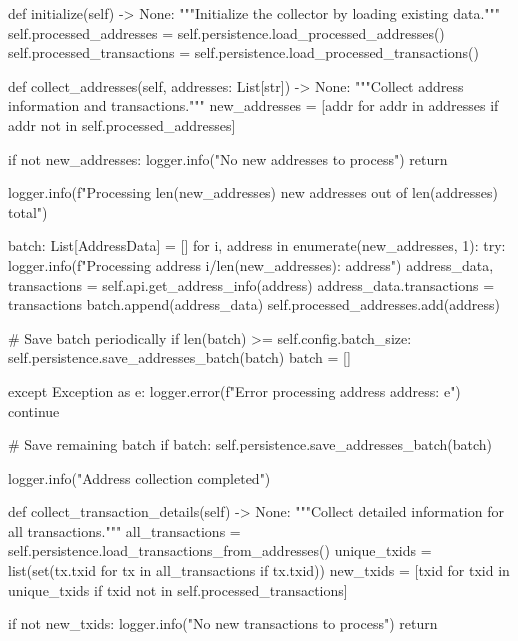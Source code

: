 \begin{codelisting}[language=Python, caption=Основной скрипт сбора данных]
    def initialize(self) -> None:
        """Initialize the collector by loading existing data."""
        self.processed_addresses = self.persistence.load_processed_addresses()
        self.processed_transactions = self.persistence.load_processed_transactions()
        
    def collect_addresses(self, addresses: List[str]) -> None:
        """Collect address information and transactions."""
        new_addresses = [addr for addr in addresses if addr not in self.processed_addresses]
        
        if not new_addresses:
            logger.info("No new addresses to process")
            return
            
        logger.info(f"Processing {len(new_addresses)} new addresses out of {len(addresses)} total")
        
        batch: List[AddressData] = []
        for i, address in enumerate(new_addresses, 1):
            try:
                logger.info(f"Processing address {i}/{len(new_addresses)}: {address}")
                address_data, transactions = self.api.get_address_info(address)
                address_data.transactions = transactions
                batch.append(address_data)
                self.processed_addresses.add(address)
                
                # Save batch periodically
                if len(batch) >= self.config.batch_size:
                    self.persistence.save_addresses_batch(batch)
                    batch = []
                    
            except Exception as e:
                logger.error(f"Error processing address {address}: {e}")
                continue
        
        # Save remaining batch
        if batch:
            self.persistence.save_addresses_batch(batch)
            
        logger.info("Address collection completed")
    
    def collect_transaction_details(self) -> None:
        """Collect detailed information for all transactions."""
        all_transactions = self.persistence.load_transactions_from_addresses()
        unique_txids = list(set(tx.txid for tx in all_transactions if tx.txid))
        new_txids = [txid for txid in unique_txids if txid not in self.processed_transactions]
        
        if not new_txids:
            logger.info("No new transactions to process")
            return
            

\end{codelisting}
